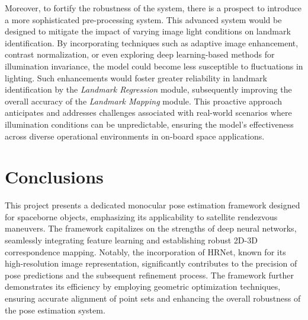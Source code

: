 Moreover, to fortify the robustness of the system, there is a prospect to introduce a more sophisticated pre-processing system. This advanced system would be designed to mitigate the impact of varying image light conditions on landmark identification. By incorporating techniques such as adaptive image enhancement, contrast normalization, or even exploring deep learning-based methods for illumination invariance, the model could become less susceptible to fluctuations in lighting. Such enhancements would foster greater reliability in landmark identification by the \textit{Landmark Regression} module, subsequently improving the overall accuracy of the \textit{Landmark Mapping} module. This proactive approach anticipates and addresses challenges associated with real-world scenarios where illumination conditions can be unpredictable, ensuring the model's effectiveness across diverse operational environments in on-board space applications.

\section{Conclusions}
This project presents a dedicated monocular pose estimation framework designed for spaceborne objects, emphasizing its applicability to satellite rendezvous maneuvers. The framework capitalizes on the strengths of deep neural networks, seamlessly integrating feature learning and establishing robust 2D-3D correspondence mapping. Notably, the incorporation of HRNet, known for its high-resolution image representation, significantly contributes to the precision of pose predictions and the subsequent refinement process. The framework further demonstrates its efficiency by employing geometric optimization techniques, ensuring accurate alignment of point sets and enhancing the overall robustness of the pose estimation system.